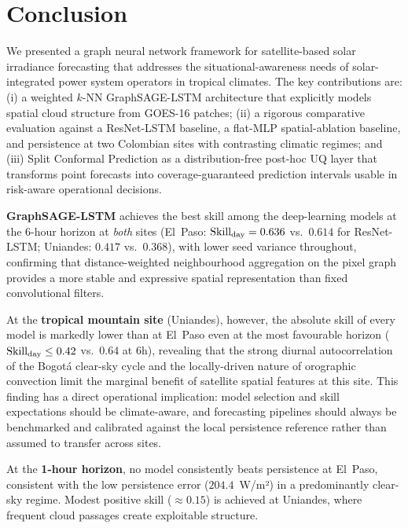 \section{Conclusion}
\label{sec:conclusion}

We presented a graph neural network framework for satellite-based solar
irradiance forecasting that addresses the situational-awareness needs of
solar-integrated power system operators in tropical climates. The key
contributions are: (i) a weighted $k$-NN GraphSAGE-LSTM architecture that
explicitly models spatial cloud structure from GOES-16 patches; (ii) a
rigorous comparative evaluation against a ResNet-LSTM baseline, a flat-MLP
spatial-ablation baseline, and persistence at two Colombian sites with
contrasting climatic regimes; and (iii) Split Conformal Prediction as a
distribution-free post-hoc UQ layer that transforms point forecasts into
coverage-guaranteed prediction intervals usable in risk-aware operational
decisions.

\textbf{GraphSAGE-LSTM} achieves the best skill among the deep-learning models
at the 6-hour horizon at \emph{both} sites (El~Paso: $\text{Skill}_\text{day} = 0.636$ vs.\
$0.614$ for ResNet-LSTM; Uniandes: $0.417$ vs.\ $0.368$), with lower seed
variance throughout, confirming that distance-weighted neighbourhood
aggregation on the pixel graph provides a more stable and expressive spatial
representation than fixed convolutional filters.

At the \textbf{tropical mountain site} (Uniandes), however, the absolute skill
of every model is markedly lower than at El~Paso even at the most favourable
horizon ($\text{Skill}_\text{day} \leq 0.42$ vs.\ $0.64$ at 6h), revealing that the strong
diurnal autocorrelation of the Bogot{\'a} clear-sky cycle and the locally-driven
nature of orographic convection limit the marginal benefit of satellite
spatial features at this site. This finding has a direct operational
implication: model selection and skill expectations should be climate-aware,
and forecasting pipelines should always be benchmarked and calibrated against
the local persistence reference rather than assumed to transfer across sites.

At the \textbf{1-hour horizon}, no model consistently beats persistence at El~Paso,
consistent with the low persistence error ($204.4$~W/m²) in a predominantly
clear-sky regime. Modest positive skill ($\approx 0.15$) is achieved at Uniandes,
where frequent cloud passages create exploitable structure.

